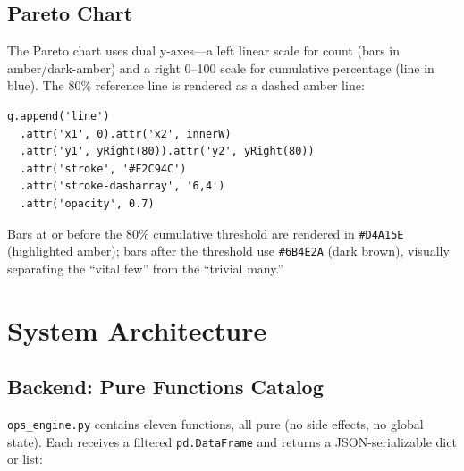 \subsection{Pareto Chart}

The Pareto chart uses dual y-axes---a left linear scale for count (bars in amber/dark-amber) and a right 0--100 scale for cumulative percentage (line in blue). The 80\% reference line is rendered as a dashed amber line:

\begin{lstlisting}[style=typescript, caption={80\% reference line in \texttt{ParetoChart.tsx}}, label=lst:pareto-80]
g.append('line')
  .attr('x1', 0).attr('x2', innerW)
  .attr('y1', yRight(80)).attr('y2', yRight(80))
  .attr('stroke', '#F2C94C')
  .attr('stroke-dasharray', '6,4')
  .attr('opacity', 0.7)
\end{lstlisting}

Bars at or before the 80\% cumulative threshold are rendered in \texttt{\#D4A15E} (highlighted amber); bars after the threshold use \texttt{\#6B4E2A} (dark brown), visually separating the ``vital few'' from the ``trivial many.''

\section{System Architecture}
\label{sec:ops-architecture}


\subsection{Backend: Pure Functions Catalog}

\texttt{ops\_engine.py} contains eleven functions, all pure (no side effects, no global state). Each receives a filtered \texttt{pd.DataFrame} and returns a JSON-serializable dict or list:

